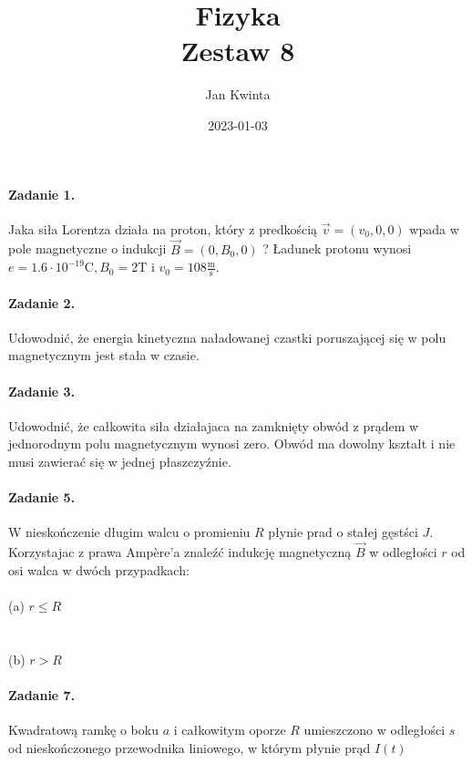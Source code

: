 \documentclass[14pt, table]{extarticle}
\title{Fizyka \\ \Large{Zestaw 8}}
\author{Jan Kwinta}
\date{2023-01-03}
\newcommand{\metr}{\textrm{m}}
\newcommand{\sekunda}{\textrm{s}}
\newcommand{\kulomb}{\textrm{C}}
\newcommand{\tesla}{\textrm{T}}
\begin{document}
\maketitle

\paragraph{Zadanie 1.}
Jaka siła Lorentza działa na proton, który z predkością $\vec{v} = (v_0, 0, 0)$ wpada w pole magnetyczne o indukcji $\vec{B} = (0, B_0, 0)$ ? Ładunek protonu wynosi $e = 1.6 \cdot 10^{-19} \kulomb, B_0 = 2 \tesla$ i $v_0 = 108 \frac{\metr}{\sekunda}$.


\newpage
\paragraph{Zadanie 2.}
Udowodnić, że energia kinetyczna naładowanej czastki poruszającej się w polu magnetycznym jest stała w czasie.


\newpage
\paragraph{Zadanie 3.}
Udowodnić, że całkowita siła działajaca na zamknięty obwód z prądem w jednorodnym polu magnetycznym wynosi zero. Obwód ma dowolny kształt i nie musi zawierać się w jednej płaszczyźnie. 


\newpage
\paragraph{Zadanie 5.}
W nieskończenie długim walcu o promieniu $R$ płynie prad o stałej gęstści $J$. Korzystajac z prawa Ampère’a znaleźć indukcję magnetyczną $\vec{B}$ w odległości $r$ od osi walca w dwóch przypadkach: \\ \\
(a) $r \leq R$ \\ \\
\vspace{250pt} \\
(b) $r > R$


\newpage
\paragraph{Zadanie 7.}
Kwadratową ramkę o boku $a$ i całkowitym oporze $R$ umieszczono w odległości $s$ od
nieskończonego przewodnika liniowego, w którym płynie prąd $I(t)$
\end{document}
